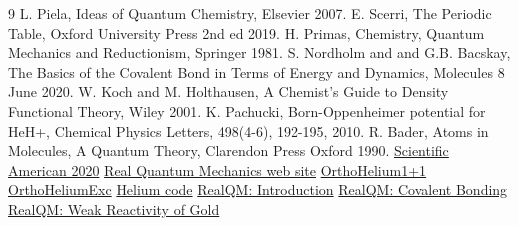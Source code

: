 \documentclass[11pt]{article} %
\begin{document}







\begin{thebibliography}{9}
 L. Piela,  Ideas of Quantum Chemistry,  Elsevier 2007.
 E. Scerri, The Periodic Table,  Oxford University Press 2nd ed 2019.
 H. Primas,  Chemistry,  Quantum Mechanics and Reductionism,  Springer 1981. 
 S. Nordholm and and G.B. Bacskay,  The Basics of the Covalent Bond in Terms of Energy and Dynamics,  Molecules 8 June 2020.
 W.  Koch and M. Holthausen,  A Chemist's Guide to Density Functional Theory,  Wiley 2001.
 K. Pachucki,  Born-Oppenheimer potential for HeH+,  Chemical  Physics Letters, 498(4-6), 192-195, 2010.
 R. Bader,  Atoms in Molecules, A Quantum Theory,  Clarendon Press Oxford 1990. 
 \href{https://www.scientificamerican.com/article/the-first-molecule-in-the-universe/}{Scientific American 2020}
 \href{https://physicalquantummechanics.wordpress.com}{Real Quantum Mechanics web site} 
\href{https://editor.p5js.org/claesjohnson/full/Ap1xZWw_C}{OrthoHelium1+1}
\href{https://editor.p5js.org/claesjohnson/full/AmaeOi9_x-}{OrthoHeliumExc}
\href{https://editor.p5js.org/claesjohnson/sketches/0MvJUe1ph_}{Helium code}
 \href{https://www.dropbox.com/scl/fo/rdzaw7bydbtlcpwthumje/AA2HaTM-j7KyK-eAJjBNHe0?rlkey=7c5tv6jrqlub85a0cto96t5w3&dl=0}{RealQM: Introduction}
\href{https://www.dropbox.com/scl/fi/qpdns2ktz4a89z7nmyd09/RealQMCovalent.pdf?rlkey=bdhvfdwlgidqj3lwum621xbli&dl=0}{RealQM: Covalent Bonding}
\href{https://www.dropbox.com/scl/fi/07i9jooczotg8j1zt3ozy/RealQMGold.pdf?rlkey=9xpbspcs1h265b70pvcrd1c72&dl=0}{RealQM: Weak Reactivity of Gold}

\end{thebibliography}
\end{document}
